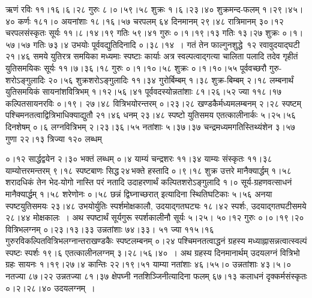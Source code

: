 \documentclass[11pt, openany]{book}
\begin{document}
\newpage

\begin{sloppypar}
\noindent ऋणं रविः ११।१६।६।२८ गुरुः ८।०।५९।५८ शुक्रः १।६।२३।४० शुक्रमन्द-फलम् १।२९।४५।४० कर्णः १८१।० अयनांशाः १८।१६।५७ चरपलम् ६४ दिनमानम् २९।४८ रात्रिमानम् ३०।१२ चरपलसंस्कृतः सूर्यः ११।८।१४।१९ गतिः ५९।४१ गुरुः ०।१।१९।१३ गतिः १३।२७ शुक्रः ०।१।५७।५७ गतिः ७३।४ उभयोः पूर्ववद्युतिदिनादि ०।३८।१४~। गतं तेन फाल्गुनशुद्धे~१२ रवावुदयाद्घटी २१।४६ समये युतिरत्र समयिका मध्यमाः स्पष्टाः कार्याः अत्र स्वल्पत्वाद्गत्या चालिता पलादि तदेव गृहीतं युतिसमयिकः सूर्यः ११।७।३६।१८ गुरुः ०।१।१०।५८ शुक्रः ०।१।१०।५५ पूर्ववच्छरौ गुरु-शरोऽङ्गुलादिः २०।५६ शुक्रशरोऽङ्गुलादिः ११।३४ गुरोर्बिम्बम् १।३८ शुक्र-बिम्बम् २।१८ लम्बनार्थं युतिसमयिकं सायनांशवित्रिभम् १।१२।५६।४१ पूर्ववदस्योन्नतांशाः ८१।२६।५२ ज्या ११८।१७ कल्पितसायनरविः ०।१९। २७।४८ वित्रिभयोरन्तरम् ०।२३।२८ खण्डकैर्मध्यमलम्बनम् २।२८ स्पष्टम् पश्चिमनतत्वाद्वित्रिभाधिक्याद्युतौ २१।४६ धनम् २३।४८ स्पष्टो युतिसमय एतत्कालीनार्कः ५।२५।५६ दिनशेषम् ०।६ लग्नवित्रिभम् २।२३।३६।५५ नतांशाः ५।३७।३७ चन्द्रमध्यमगतिस्तिथ्यंशेन ३।५७ गुणा २२।१३ त्रिज्या १२० लब्धम्
\end{sloppypar}

\newpage

\begin{sloppypar}
\noindent ०।१२ सार्द्धद्वयेन २।३० भक्तं लब्धम् ०।४ याम्यं चन्द्रशरः ११।३४ याम्यः संस्कृतः ११।३८ याम्योत्तरमन्तरम् ९।१८ स्पष्टबाणः सिद्ध\textendash \,२४\textendash \,भक्ते हस्तादि ०।९।१८ शुक्र उत्तरे मानैक्यार्द्धम् १।५८ शरादधिकं तेन भेद-योगो नास्ति परं नतादि उदाहरणार्थं कल्पितशरोऽङ्गुलादि १।० सूर्य-ग्रहणवत्साधनं मानैक्यार्द्धम् १।५८ शरेणोनः ०।५८ छन्नं द्विघ्नाच्छरात् इत्यादिना स्थितिघटिकाः ५।५६ अनया स्पष्टयुतिसमयः २३।४८ उभयोर्युतिः स्पर्शमोक्षकालौ, उदयाद्गतघट्यः १८।४२ स्पर्शः, उदयाद्गतघटीसमये २८।४४ मोक्षकालः~। अथ स्पष्टार्थं सूर्यगुरू स्पर्शकालीनौ सूर्यः ५।२५। ५०।१२ गुरुः ०।०।१९।२० वित्रिभलग्नम् ०।२३।१३।३३ उन्नतांशाः ७४।३३। ५१ ज्या ११५।१६ गुरुरविकल्पितवित्रिभलग्नान्तराखण्डकैः स्पष्टलम्बनम् ०।२४ पश्चिमनतत्वाद्धनं ग्रहस्य मध्याह्नासन्नत्वात्स्वल्पं स्पष्टः स्पर्शः १९।६ एतत्कालीनलग्नम् ३।२८।५६।४०~। अथ ग्रहस्य दिनमानार्थम् उदयलग्नं वित्रिभो ग्रहः सायनः १।१९।२७।४ कान्तिः २२।१९।५१ याम्या नतांशाः ४६।५५।० उन्नतांशाः ४३।५।० नतज्या ८७।२२ उन्नतज्या ८१।३७ क्षेपघ्नी नतशिञ्जिनीत्यादिना फलम् ६७।१३ कलाधनं दृक्कर्मसंस्कृतः ०।२।२८।४० उदयलग्नम्~।
\end{sloppypar}

\newpage
\end{document}
